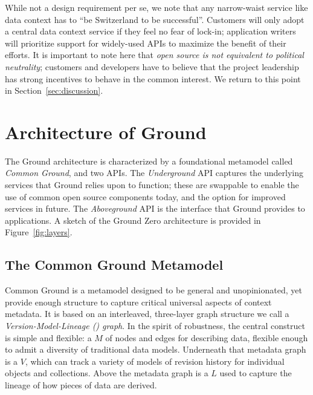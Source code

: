 \documentclass{sig-alternate}
\begin{document}
  While not a design requirement per se, we note that any narrow-waist service like data context has to ``be Switzerland to be successful''.  Customers will only adopt a central data context service if they feel no fear of lock-in; application writers will prioritize support for widely-used APIs to maximize the benefit of their efforts. 
It is important to note here that \emph{open source is not equivalent to political neutrality}; customers and developers have to believe that the project leadership has strong incentives to behave in the common interest. We return to this point in Section~\ref{sec:discussion}.

\vspace{1em}

\section{Architecture of Ground}
\label{sec:arch}
The Ground architecture is characterized by a foundational metamodel called \emph{Common Ground}, and two APIs.  The \emph{Underground} API captures the underlying services that Ground relies upon to function; these are swappable to enable the use of common open source components today, and the option for improved services in future. The \emph{Aboveground} API is the interface that Ground provides to applications.
A sketch of the Ground Zero architecture is provided in Figure~\ref{fig:layers}.


\subsection{The Common Ground Metamodel}
Common Ground is a metamodel designed to be general and unopinionated, yet provide enough structure to capture  critical universal aspects of context metadata.  It is based on an interleaved, three-layer graph structure we call a \emph{Version-Model-Lineage (\vml) graph}.  In the spirit of robustness, the central construct is simple and flexible: a \modelgraph $M$ of nodes and edges for describing data, flexible enough to admit a diversity of traditional data models.
Underneath that metadata graph is a \versiongraph $V$, which can track a variety of models 
of revision history for individual objects and collections. Above the metadata graph is a 
\lineagegraph $L$ used to capture the lineage of how pieces of data are derived.
\end{document}
